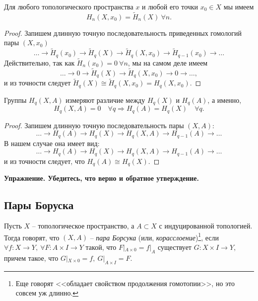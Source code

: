     \begin{corollary}\label{ParaCor1}
         Для любого топологического пространства $x$ и любой его точки $x_0 \in X$ мы имеем
        \[ H_{n}(X, x_0) = \widetilde{H}_{n}(X) \ \forall n. \]
    \end{corollary}
    \begin{proof}
        Запишем длинную точную последовательность приведенных гомологий пары $(X, x_0)$
        \[ \ldots \to  \widetilde{H}_{q}(x_0) \to \widetilde{H}_{q}(X) \to \widetilde{H}_{q}(X, x_0) \to \widetilde{H}_{q - 1}(x_0) \to \ldots \]
        Действительно, так как $\widetilde{H}_n(x_0) = 0 \ \forall n$, мы на самом деле имеем
        \[ \ldots \to 0 \to \widetilde{H}_{q}(X) \to \widetilde{H}_{q}(X, x_0) \to 0 \to \ldots, \]
        и из точности следует $\widetilde{H}_{q}(X) \cong \widetilde{H}_{q}(X, x_0) = H_{q}(X, x_0)$.
    \end{proof}

    \begin{corollary}
        Группы $H_{q}(X, A)$ измеряют различие между $H_{q}(X)$ и $H_{q}(A)$, а именно,
        \[ H_{q}(X, A) = 0  \quad \forall{q} \Rightarrow H_{q}(A) = H_{q}(X) \quad \forall q. \]
    \end{corollary}
    \begin{proof}
        Запишем длинную точную последовательность пары $(X, A):$
        \[ \ldots \to  H_{q}(A) \to H_{q}(X) \to H_{q}(X, A) \to H_{q - 1}(A) \to \ldots \]
        В нашем случае она имеет вид:
        \[ \ldots \to  H_{q}(A) \to H_{q}(X) \to H_{q}(X, A) \to H_{q - 1}(A) \to \ldots \]
        и из точности следует, что $H_{q}(A) \cong H_{q}(X)$.
    \end{proof}

    \noindent\bf{Упражнение.} Убедитесь, что верно и обратное утверждение.

    \subsection{Пары Боруска}

    \begin{definition}
        Пусть $X$ -- топологическое пространство, а $A \subset X$ с индуцированной топологией. Тогда говорят, что $(X, A)$ --
        \emph{пара Борсука} (или, \emph{корасслоение})\footnote{Еще говорят <<обладает свойством продолжения гомотопии>>, но это совсем уж длинно.}, если $\forall f \colon X \to Y, \ \forall F \colon A \times I \to Y$ такой, что $F|_{A \times 0} = f|_{A}$
        существует $G\colon X \times I \to Y$, причем такое, что $G|_{X \times 0} = f, \ G|_{A \times I } = F$.
    \end{definition}

